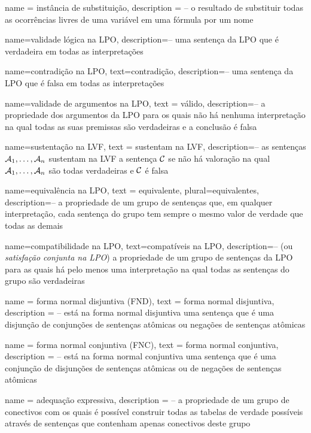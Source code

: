 {
 name = instância de substituição,
 description = {-- o resultado de substituir todas as ocorrências livres de uma variável em uma fórmula por um nome}
}

{
 name=validade lógica na LPO,
 description={-- uma sentença da LPO que é verdadeira em todas as interpretações}
}

{
 name=contradição na LPO,
 text=contradição,
 description={--  uma sentença da LPO que é falsa em todas as interpretações}
} 

{
 name=validade de argumentos na LPO,
 text = válido,
 description={-- a propriedade dos argumentos da LPO para os quais não há nenhuma interpretação na qual todas as suas premissas são verdadeiras e a conclusão é falsa}
}

{
 name=sustentação na LVF,
 text = sustentam na LVF,
 description={-- as sentenças $\mathcal{A}_1, \ldots, \mathcal{A}_n$ sustentam na LVF a sentença $\mathcal{C}$ se não há valoração na qual $\mathcal{A}_1, \ldots, \mathcal{A}_n$ são todas verdadeiras e $\mathcal{C}$ é falsa}
}

{
 name=equivalência na LPO,
 text = equivalente,
 plural=equivalentes,
 description={-- a propriedade de um grupo de sentenças que, em qualquer interpretação, cada sentença do grupo tem sempre o mesmo valor de verdade que todas as demais}
}

{
 name=compatibilidade na LPO,
 text=compatíveis na LPO,
 description={-- (ou \textit{satisfação conjunta na LPO}) a propriedade de um grupo de sentenças da LPO para as quais há pelo menos uma interpretação na qual todas as sentenças do grupo são verdadeiras}
}

{
 name = forma normal disjuntiva (FND),
 text = forma normal disjuntiva,
 description = {-- está na forma normal disjuntiva uma sentença que é uma disjunção de conjunções de sentenças atômicas ou negações de sentenças atômicas}
}

{
 name = forma normal conjuntiva (FNC),
 text = forma normal conjuntiva,
 description = {-- está na forma normal conjuntiva uma sentença que é uma conjunção de disjunções de sentenças atômicas ou de negações de sentenças atômicas}
}

{
 name = adequação expressiva,
 description = {-- a propriedade de um grupo de conectivos com os quais é possível construir todas as tabelas de verdade possíveis através de sentenças que contenham apenas conectivos deste grupo}
}

